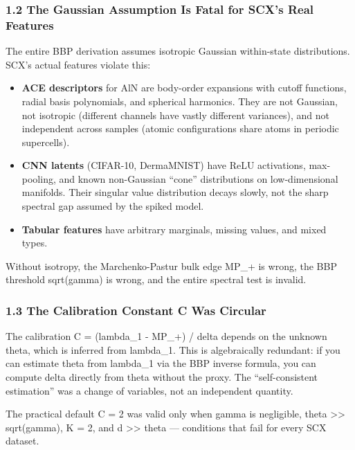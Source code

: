 \documentclass[
  12pt,
]{ctexart}
\providecommand{\tightlist}{%
  \setlength{\itemsep}{0pt}\setlength{\parskip}{0pt}}
\begin{document}
\subsubsection{1.2 The Gaussian Assumption Is Fatal for SCX's Real
Features}\label{the-gaussian-assumption-is-fatal-for-scxs-real-features}

The entire BBP derivation assumes isotropic Gaussian within-state
distributions. SCX's actual features violate this:

\begin{itemize}
\tightlist
\item
  \textbf{ACE descriptors} for AlN are body-order expansions with cutoff
  functions, radial basis polynomials, and spherical harmonics. They are
  not Gaussian, not isotropic (different channels have vastly different
  variances), and not independent across samples (atomic configurations
  share atoms in periodic supercells).
\item
  \textbf{CNN latents} (CIFAR-10, DermaMNIST) have ReLU activations,
  max-pooling, and known non-Gaussian ``cone'' distributions on
  low-dimensional manifolds. Their singular value distribution decays
  slowly, not the sharp spectral gap assumed by the spiked model.
\item
  \textbf{Tabular features} have arbitrary marginals, missing values,
  and mixed types.
\end{itemize}

Without isotropy, the Marchenko-Pastur bulk edge MP\_+ is wrong, the BBP
threshold sqrt(gamma) is wrong, and the entire spectral test is invalid.

\subsubsection{1.3 The Calibration Constant C Was
Circular}\label{the-calibration-constant-c-was-circular}

The calibration C = (lambda\_1 - MP\_+) / delta depends on the unknown
theta, which is inferred from lambda\_1. This is algebraically
redundant: if you can estimate theta from lambda\_1 via the BBP inverse
formula, you can compute delta directly from theta without the proxy.
The ``self-consistent estimation'' was a change of variables, not an
independent quantity.

The practical default C = 2 was valid only when gamma is negligible,
theta \textgreater\textgreater{} sqrt(gamma), K = 2, and d
\textgreater\textgreater{} theta --- conditions that fail for every SCX
dataset.
\end{document}
